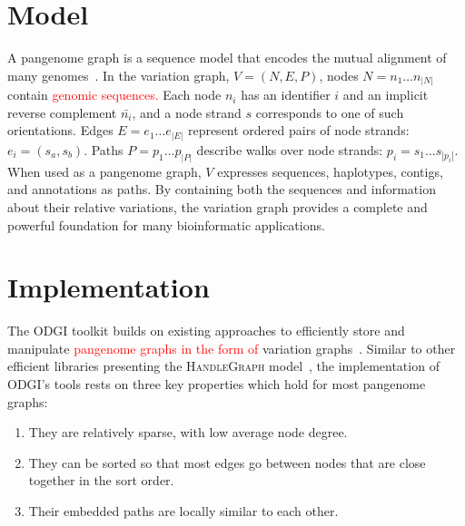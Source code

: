 \documentclass{bioinfo}
\newcommand{\REVIEWED}[1]{{\textcolor{Red}{#1}}}
\begin{document}
\section{Model}
A pangenome graph is a sequence model that encodes the mutual alignment of many genomes~\citep{Garrison_2019_thesis,Eizenga_2020}.
In the variation graph, $V = (N, E, P)$, nodes $N = n_1\ldots n_{|N|}$ contain \REVIEWED{genomic sequences.}
Each node $n_i$ has an identifier $i$ and an implicit reverse complement $\bar{n_i}$, and a node strand $s$ corresponds to one of such orientations.
Edges $E = e_1\ldots e_{|E|}$ represent ordered pairs of node strands: $e_i = ( s_a, s_b )$.
Paths $P = p_1\ldots p_{|P|}$ describe walks over node strands: $p_i = s_1 \ldots s_{|p_i|}$.
When used as a pangenome graph, $V$ expresses sequences, haplotypes, contigs, and annotations as paths.
By containing both the sequences and information about their relative variations, the variation graph provides a complete and powerful foundation for many bioinformatic applications.


\section{Implementation}
The ODGI toolkit builds on existing approaches to efficiently store and manipulate \REVIEWED{pangenome graphs in the form of} variation graphs~\citep{Garrison:2018}.
Similar to other efficient libraries presenting the \textsc{HandleGraph} model~\citep{Eizenga_2020_BX}, the implementation of ODGI's tools rests on three key properties which hold for most pangenome graphs:

\begin{enumerate}
\item They are relatively sparse, with low average node degree.
\item They can be sorted so that most edges go between nodes that are close together in the sort order.
\item Their embedded paths are locally similar to each other.
\end{enumerate}
\end{document}
